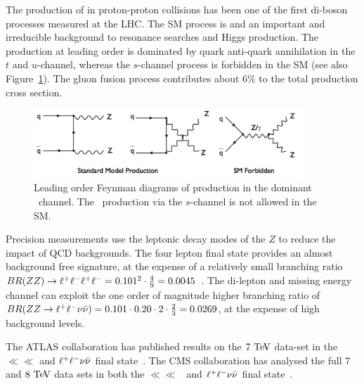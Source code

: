 The production of \ZZ in proton-proton collisions has been one of the first di-boson 
processes measured at the LHC. The SM process is and an important and irreducible
background to resonance searches and Higgs production. The production at leading
order is dominated by quark anti-quark annihilation in the $t$ and $u$-channel,
whereas the $s$-channel process is forbidden in the SM 
(see also Figure~\ref{fig:sss-ZZprod-LOdiagrams}). The gluon fusion process 
contributes about 6\% to the total production cross section. 

\begin{figure}[htbp]
  \begin{center}
  \includegraphics[width=0.9\textwidth]{figures/sss-inclboson-diboson-zzprod-zzdiagram.png}
  \caption{Leading order Feynman diagrams of \ZZ production in the dominant 
  \qqbar\ channel. The \ZZ\ production via the $s$-channel is not allowed in the SM.}
\label{fig:sss-ZZprod-LOdiagrams}
\end{center}
\end{figure}

Precision measurements use the leptonic decay modes of the $Z$ to reduce the impact of
QCD backgrounds. 
The four lepton final state provides an almost background free signature, at the
expense of a relatively small branching ratio 
$BR(ZZ) \to \ll\ll = 0.101^2 \cdot {4 \over 9} = 0.0045$~\cite{PDG}.  
The di-lepton and missing energy channel can exploit the one order of magnitude
higher branching ratio of 
$BR(\ZZ \to \ll\vv) = 0.101 \cdot 0.20 \cdot 2 \cdot {2 \over 3} = 0.0269$, 
at the expense of high background levels.

The ATLAS collaboration has published results on the $7\TeV$ data-set 
in the $\ll\ll$ and $\ll\vv$ final state~\cite{Aad:2012awa}. The CMS collaboration
has analysed the full 7 and $8\TeV$ data sets in both 
the $\ll\ll$~\cite{Chatrchyan:2012sga,Khachatryan:2014dia} and 
$\ll\vv$ final state~\cite{Khachatryan:2015pba}.

